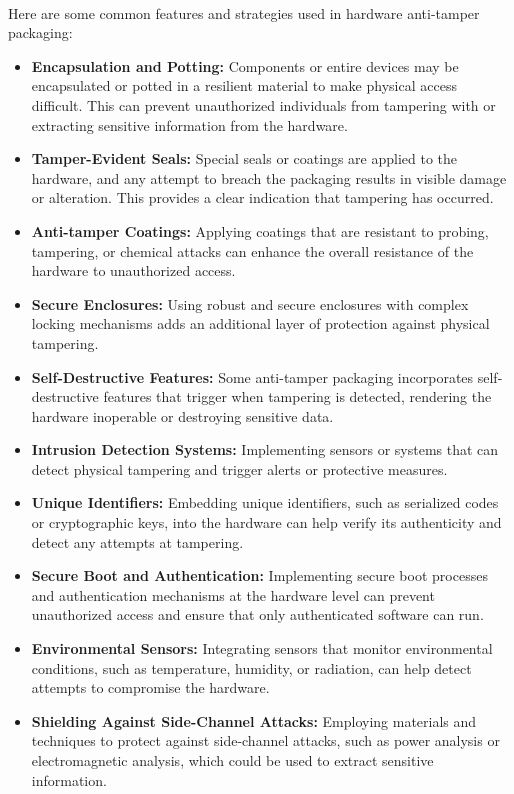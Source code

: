 \paragraph*{}
Here are some common features and strategies used in hardware anti-tamper packaging:
\begin{itemize}
	\item \textbf{Encapsulation and Potting:} Components or entire devices may be encapsulated or potted in a resilient material to make physical access difficult. This can prevent unauthorized individuals from tampering with or extracting sensitive information from the hardware.
	\item \textbf{Tamper-Evident Seals:} Special seals or coatings are applied to the hardware, and any attempt to breach the packaging results in visible damage or alteration. This provides a clear indication that tampering has occurred.
	\item \textbf{Anti-tamper Coatings:} Applying coatings that are resistant to probing, tampering, or chemical attacks can enhance the overall resistance of the hardware to unauthorized access.
	\item \textbf{Secure Enclosures:} Using robust and secure enclosures with complex locking mechanisms adds an additional layer of protection against physical tampering.
	\item \textbf{Self-Destructive Features:} Some anti-tamper packaging incorporates self-destructive features that trigger when tampering is detected, rendering the hardware inoperable or destroying sensitive data.
	\item \textbf{Intrusion Detection Systems:} Implementing sensors or systems that can detect physical tampering and trigger alerts or protective measures.
	\item \textbf{Unique Identifiers:} Embedding unique identifiers, such as serialized codes or cryptographic keys, into the hardware can help verify its authenticity and detect any attempts at tampering.
	\item \textbf{Secure Boot and Authentication:} Implementing secure boot processes and authentication mechanisms at the hardware level can prevent unauthorized access and ensure that only authenticated software can run.
	\item \textbf{Environmental Sensors:} Integrating sensors that monitor environmental conditions, such as temperature, humidity, or radiation, can help detect attempts to compromise the hardware.
	\item \textbf{Shielding Against Side-Channel Attacks:} Employing materials and techniques to protect against side-channel attacks, such as power analysis or electromagnetic analysis, which could be used to extract sensitive information.
\end{itemize}
